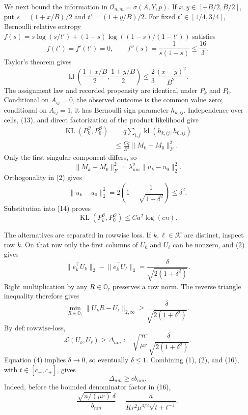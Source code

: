 We next bound the information in \(\mathcal O_{n,m}=\sigma(A,Y,p)\).  If \(x,y\in[-B/2,B/2]\), put \(s=(1+x/B)/2\) and \(t'=(1+y/B)/2\).  For fixed \(t'\in[1/4,3/4]\), Bernoulli relative entropy \(f(s)=s\log(s/t')+(1-s)\log((1-s)/(1-t'))\) satisfies
\[
 f(t')=f'(t')=0,
 \qquad f''(s)=\frac1{s(1-s)}\le\frac{16}3.
\]
Taylor's theorem gives
\[
 \operatorname{kl}\left(\frac{1+x/B}{2},\frac{1+y/B}{2}\right)
 \le \frac{2}{3}\frac{(x-y)^2}{B^2}.
 \tag{13}
\]
The assignment law and recorded propensity are identical under \(P_k\) and \(P_0\).  Conditional on \(A_{ij}=0\), the observed outcome is the common value zero; conditional on \(A_{ij}=1\), it has Bernoulli sign parameter \(h_{k,ij}\).  Independence over cells, (13), and direct factorization of the product likelihood give
\[
 \begin{aligned}
 \operatorname{KL}(P_k^{\mathcal O},P_0^{\mathcal O})
 &=q\sum_{i,j}\operatorname{kl}(h_{k,ij},h_{0,ij})\\
 &\le \frac{Cq}{B^2}\lVert M_k-M_0\rVert_F^2.
 \end{aligned}
 \tag{14}
\]
Only the first singular component differs, so
\[
 \lVert M_k-M_0\rVert_F^2
 =\lambda_{nm}^2\lVert u_k-u_0\rVert_2^2.
\]
Orthogonality in (2) gives
\[
 \lVert u_k-u_0\rVert_2^2
 =2\left(1-\frac1{\sqrt{1+\delta^2}}\right)
 \le\delta^2.
\]
Substitution into (14) proves
\[
 \operatorname{KL}(P_k^{\mathcal O},P_0^{\mathcal O})
 \le Ca^2\log(en).
 \tag{15}
\]

The alternatives are separated in rowwise loss.  If \(k,\ell\in\mathcal K\) are distinct, inspect row \(k\).  On that row only the first columns of \(U_k\) and \(U_\ell\) can be nonzero, and (2) gives
\[
 \lVert e_k^\top U_k\rVert_2-\lVert e_k^\top U_\ell\rVert_2
 =\frac{\delta}{\sqrt{2(1+\delta^2)}}.
\]
Right multiplication by any \(R\in\mathbb O_r\) preserves a row norm.  The reverse triangle inequality therefore gives
\[
 \min_{R\in\mathbb O_r}\lVert U_kR-U_\ell\rVert_{2,\infty}
 \ge\frac{\delta}{\sqrt{2(1+\delta^2)}}.
\]
By \(\mathrm{def:rowwise\mbox{-}loss}\),
\[
 \mathcal L(U_k,U_\ell)
 \ge \Delta_{nm}:=\sqrt{\frac n{\mu r}}
       \frac{\delta}{\sqrt{2(1+\delta^2)}}.
 \tag{16}
\]
Equation (4) implies \(\delta\to0\), so eventually \(\delta\le1\).  Combining (1), (2), and (16), with \(t\in[c_-,c_+]\), gives
\[
 \Delta_{nm}\ge c b_{nm}.
 \tag{17}
\]
Indeed, before the bounded denominator factor in (16),
\[
 \frac{\sqrt{n/(\mu r)}\,\delta}{b_{nm}}
 =\frac{a}{K r^2\mu^{3/2}\sqrt{t+t^{-1}}}.
\]

